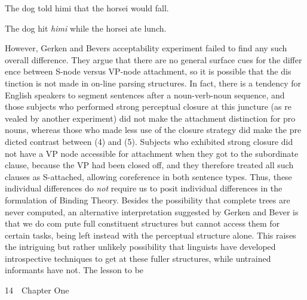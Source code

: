 \setcounter{listWWNumlxviileveli}{3}
\begin{listWWNumlxviileveli}
\item 
\begin{styleTextbody}
The dog told himi that the horsei would fall.
\end{styleTextbody}


\item 
\begin{styleTextbody}
The dog hit \textit{himi}\textit{ }while the horsei ate lunch.
\end{styleTextbody}


\end{listWWNumlxviileveli}
\begin{styleTextbody}
However, Gerken and Bever{\textquotesingle}s acceptability experiment failed to find any such overall difference. They argue that there are no general surface cues for the differ\- ence between S-node versus VP-node attachment, so it is possible that the dis\- tinction is not made in on-line parsing structures. In fact, there is a tendency for English speakers to segment sentences after a noun-verb-noun sequence, and those subjects who performed strong perceptual closure at this juncture (as re\- vealed by another experiment) did not make the attachment distinction for pro\- nouns, whereas those who made less use of the closure strategy did make the pre\- dicted contrast between (4) and (5). Subjects who exhibited strong closure did not have a VP node accessible for attachment when they got to the subordinate clause, because the VP had been closed off, and they therefore treated all such clauses as S-attached, allowing coreference in both sentence types. Thus, these individual differences do \textit{not}\textit{ }require us to posit individual differences in the formulation of Binding Theory. Besides the possibility that complete trees are never computed, an alternative interpretation suggested by Gerken and Bever is that we do com\- pute full constituent structures but cannot access them for certain tasks, being left instead with the perceptual structure alone. This raises the intriguing but rather unlikely possibility that linguists have developed introspective techniques to get at these fuller structures, while untrained informants have not. The lesson to be
\end{styleTextbody}


\clearpage\setcounter{page}{1}\begin{styleStandard}
14\ \ Chapter One
\end{styleStandard}


